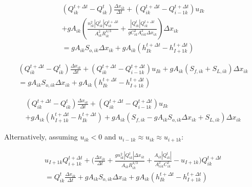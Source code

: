 \documentclass[11pt]{article}
\begin{document}
\begin{equation}
  \begin{split}
    (Q_{ik}^{t + \Delta t} - Q_{ik}^t) \frac{\Delta x_{ik}}{\Delta t} + (Q_{ik}^{t + \Delta t} - Q_{i - 1k}^{t + \Delta t}) u_{Ik} \\ + g A_{ik} (\frac{n_{ik}^2 |Q_{ik}^t| Q_{ik}^{t + \Delta t}}{A_{ik}^2 R_{ik}^{4/3}} + \frac{|Q_{ik}^t| Q_{ik}^{t + \Delta t}}{g C_{ik}^2 A_{cik}^2 \Delta x_{ik}}) \Delta x_{ik} \\ =
    g A_{ik} S_{o,ik} \Delta x_{ik} + g A_{ik} (h_{Ik}^{t + \Delta t} - h_{I+1k}^{t + \Delta t})
  \end{split}
\end{equation}


\begin{equation}
  \begin{split}
    (Q_{ik}^{t + \Delta t} - Q_{ik}^t) \frac{\Delta x_{ik}}{\Delta t} + (Q_{ik}^{t + \Delta t} - Q_{i - 1k}^{t + \Delta t}) u_{Ik} + g A_{ik} (S_{f,ik} + S_{L,ik}) \Delta x_{ik} \\ =
    g A_{ik} S_{o,ik} \Delta x_{ik} + g A_{ik} (h_{Ik}^{t + \Delta t} - h_{I+1k}^{t + \Delta t})
  \end{split}
\end{equation}

\begin{equation}
  \begin{split}
    (Q_{ik}^{t + \Delta t} - Q_{ik}^t) \frac{\Delta x_{ik}}{\Delta t} + (Q_{ik}^{t + \Delta t} - Q_{i - 1k}^{t + \Delta t}) u_{Ik} \\ + g A_{ik} (h_{I+1k}^{t + \Delta t} - h_{Ik}^{t + \Delta t}) + g A_{ik} (S_{f,ik} -
    g A_{ik} S_{o,ik} \Delta x_{ik} + S_{L,ik}) \Delta x_{ik}
  \end{split}
\end{equation}

Alternatively, assuming $u_{ik} < 0$ and $u_{i-1k} \approx u_{ik} \approx u_{i+1k}$:

\begin{equation}
  \begin{split}
    u_{I+1k} Q_{i+1k}^{t + \Delta t} + \biggl(\frac{\Delta x_{ik}}{\Delta t} + \frac{g n_{ik}^2 |Q_{ik}^t| \Delta x_{ik}}{A_{ik} R_{ik}^{4/3}} + \frac{A_{ik} |Q_{ik}^t|}{A_{cik}^2 C_{ik}^2} - u_{I+1k} \biggr) Q_{ik}^{t + \Delta t} \\ =
    Q_{ik}^t \frac{\Delta x_{ik}}{\Delta t} + g A_{ik} S_{o,ik} \Delta x_{ik} + g A_{ik} (h_{Ik}^{t + \Delta t} - h_{I+1k}^{t + \Delta t})
  \end{split}
\end{equation}
\end{document}
